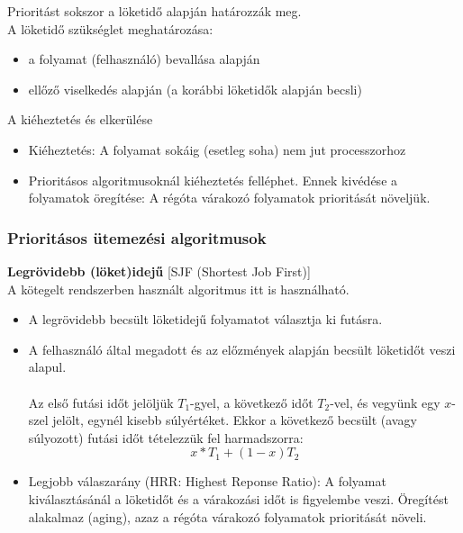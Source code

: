 \documentclass[tikz,12pt,margin=0px]{article}
\begin{document}
    \noindent Prioritást sokszor a löketidő alapján határozzák meg.\\

    \noindent A löketidő szükséglet meghatározása:
    \begin{itemize}[topsep=8pt,itemsep=4pt,partopsep=4pt, parsep=4pt]
      \item a folyamat (felhasználó) bevallása alapján
      \item ellőző viselkedés alapján (a korábbi löketidők alapján becsli)
    \end{itemize}

    \noindent A kiéheztetés és elkerülése
    \begin{itemize}[topsep=8pt,itemsep=4pt,partopsep=4pt, parsep=4pt]
      \item Kiéheztetés: A folyamat sokáig (esetleg soha) nem jut processzorhoz
      \item Prioritásos algoritmusoknál kiéheztetés felléphet. Ennek kivédése a folyamatok öregítése: A régóta várakozó folyamatok prioritását növeljük.\\
    \end{itemize}
\newpage
    \subsubsection*{Prioritásos ütemezési algoritmusok\\}

    \noindent \textbf{Legrövidebb (löket)idejű} [SJF (Shortest Job First)]\\

    \noindent A kötegelt rendszerben használt algoritmus itt is használható.

    \begin{itemize}[topsep=8pt,itemsep=4pt,partopsep=4pt, parsep=4pt]
        \item A legrövidebb becsült löketidejű folyamatot választja ki futásra.
        \item A felhasználó által megadott és az előzmények alapján becsült löketidőt veszi alapul.\\\\
        Az első futási időt jelöljük $T_1$-gyel, a következő időt $T_2$-vel, és vegyünk egy $x$-szel jelölt, egynél kisebb súlyértéket. Ekkor a következő becsült (avagy súlyozott) futási időt tételezzük fel harmadszorra:
        \[
            x * T_{1} + (1 - x)T_{2}
        \]
        \item Legjobb válaszarány (HRR: Highest Reponse Ratio): A folyamat kiválasztásánál a löketidőt és a várakozási időt is figyelembe veszi. Öregítést alakalmaz (aging), azaz a régóta várakozó folyamatok prioritását növeli.\\
    \end{itemize}
\end{document}
